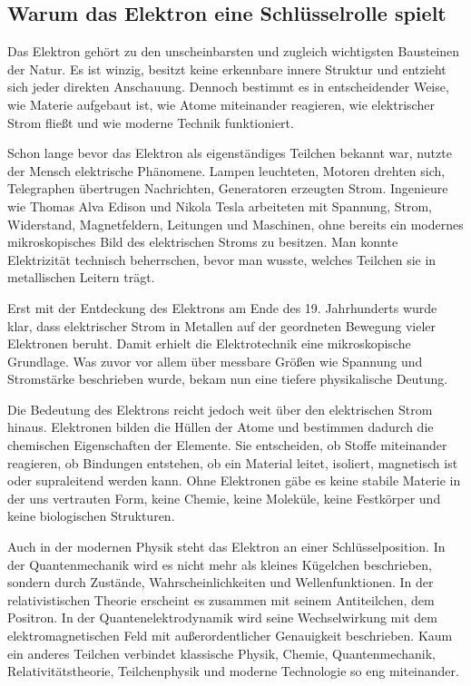 
\subsection{Warum das Elektron eine Schlüsselrolle spielt}

\label{sec:warum-elektron-schluesselrolle}

Das Elektron gehört zu den unscheinbarsten und zugleich wichtigsten Bausteinen der Natur.
Es ist winzig, besitzt keine erkennbare innere Struktur und entzieht sich jeder direkten
Anschauung. Dennoch bestimmt es in entscheidender Weise, wie Materie aufgebaut ist,
wie Atome miteinander reagieren, wie elektrischer Strom fließt und wie moderne Technik
funktioniert.

Schon lange bevor das Elektron als eigenständiges Teilchen bekannt war, nutzte der Mensch
elektrische Phänomene. Lampen leuchteten, Motoren drehten sich, Telegraphen übertrugen
Nachrichten, Generatoren erzeugten Strom. Ingenieure wie Thomas Alva Edison und Nikola Tesla
arbeiteten mit Spannung, Strom, Widerstand, Magnetfeldern, Leitungen und Maschinen, ohne bereits
ein modernes mikroskopisches Bild des elektrischen Stroms zu besitzen. Man konnte Elektrizität
technisch beherrschen, bevor man wusste, welches Teilchen sie in metallischen Leitern trägt.

Erst mit der Entdeckung des Elektrons am Ende des 19. Jahrhunderts wurde klar, dass elektrischer
Strom in Metallen auf der geordneten Bewegung vieler Elektronen beruht. Damit erhielt die
Elektrotechnik eine mikroskopische Grundlage. Was zuvor vor allem über messbare Größen wie
Spannung und Stromstärke beschrieben wurde, bekam nun eine tiefere physikalische Deutung.

Die Bedeutung des Elektrons reicht jedoch weit über den elektrischen Strom hinaus. Elektronen
bilden die Hüllen der Atome und bestimmen dadurch die chemischen Eigenschaften der Elemente.
Sie entscheiden, ob Stoffe miteinander reagieren, ob Bindungen entstehen, ob ein Material leitet,
isoliert, magnetisch ist oder supraleitend werden kann. Ohne Elektronen gäbe es keine stabile
Materie in der uns vertrauten Form, keine Chemie, keine Moleküle, keine Festkörper und keine
biologischen Strukturen.

Auch in der modernen Physik steht das Elektron an einer Schlüsselposition. In der Quantenmechanik
wird es nicht mehr als kleines Kügelchen beschrieben, sondern durch Zustände, Wahrscheinlichkeiten
und Wellenfunktionen. In der relativistischen Theorie erscheint es zusammen mit seinem Antiteilchen,
dem Positron. In der Quantenelektrodynamik wird seine Wechselwirkung mit dem elektromagnetischen
Feld mit außerordentlicher Genauigkeit beschrieben. Kaum ein anderes Teilchen verbindet klassische
Physik, Chemie, Quantenmechanik, Relativitätstheorie, Teilchenphysik und moderne Technologie so
eng miteinander.

